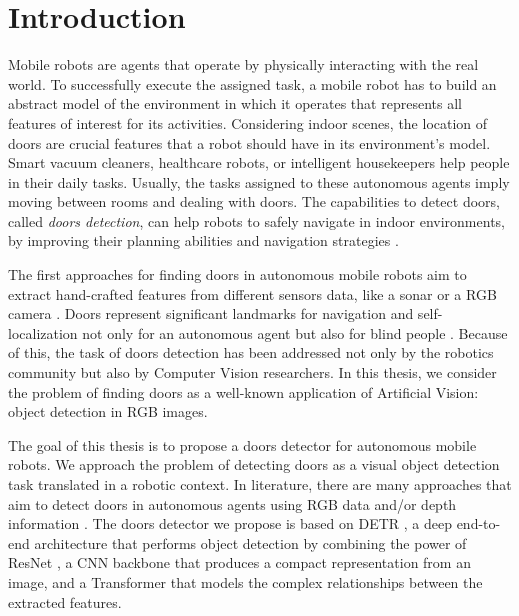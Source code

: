 
\hypertarget{Introduzione}{%
	\chapter{Introduction}\label{header-n3}}

Mobile robots are agents that operate by physically interacting with the real world. To successfully execute the assigned task, a mobile robot has to build an abstract model of the environment in which it operates that represents all features of interest for its activities. Considering indoor scenes, the location of doors are crucial features that a robot should have in its environment's model.  Smart vacuum cleaners, healthcare robots, or intelligent housekeepers help people in their daily tasks. Usually, the tasks assigned to these autonomous agents imply moving between rooms and dealing with doors. The capabilities to detect doors, called \emph{doors detection}, can help robots to safely navigate in indoor environments, by improving their planning abilities and navigation strategies \cite{sonarandivisualdoordetection, doorsandnavigation, humanoid}. 

The first approaches for finding doors in autonomous mobile robots aim to extract hand-crafted features from different sensors data, like a sonar \cite{sonarandivisualdoordetection} or a RGB camera \cite{humanoid}. Doors represent significant landmarks for navigation and self-localization not only for an autonomous agent but also for blind people \cite{edgeandcornerdoorsdetector}. Because of this, the task of doors detection has been addressed not only by the robotics community but also by Computer Vision researchers. In this thesis, we consider the problem of finding doors as a well-known application of Artificial Vision: object detection in RGB images. 

The goal of this thesis is to propose a doors detector for autonomous mobile robots. We approach the problem of detecting doors as a visual object detection task translated in a robotic context. In literature, there are many approaches that aim to detect doors in autonomous agents using RGB data \cite{doorsandnavigation, detectdoorsfeature} and/or depth information \cite{doorcabinet}. The doors detector we propose is based on DETR \cite{detr}, a deep end-to-end architecture that performs object detection by combining the power of ResNet \cite{resnet}, a CNN backbone that produces a compact representation from an image, and a Transformer \cite{transformer} that models the complex relationships between the extracted features.

